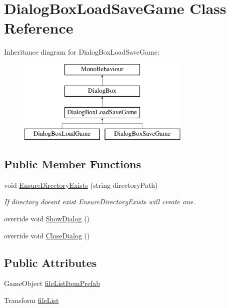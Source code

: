 \hypertarget{class_dialog_box_load_save_game}{}\section{Dialog\+Box\+Load\+Save\+Game Class Reference}
\label{class_dialog_box_load_save_game}
Inheritance diagram for Dialog\+Box\+Load\+Save\+Game\+:\begin{figure}[H]
\begin{center}
\leavevmode
\includegraphics[height=4.000000cm]{class_dialog_box_load_save_game}
\end{center}
\end{figure}
\subsection*{Public Member Functions}
\begin{DoxyCompactItemize}
\item 
void \hyperlink{class_dialog_box_load_save_game_adb463c1d803a7e68e0378b6e48fb2a85}{Ensure\+Directory\+Exists} (string directory\+Path)
\begin{DoxyCompactList}\small\item\em If directory doesn\textquotesingle{}t exist Ensure\+Directory\+Exists will create one. \end{DoxyCompactList}\item 
override void \hyperlink{class_dialog_box_load_save_game_ae44957b0dcc55696639d534c04574c57}{Show\+Dialog} ()
\item 
override void \hyperlink{class_dialog_box_load_save_game_ad3b5e6ab617a831b4db61010812e7665}{Close\+Dialog} ()
\end{DoxyCompactItemize}
\subsection*{Public Attributes}
\begin{DoxyCompactItemize}
\item 
Game\+Object \hyperlink{class_dialog_box_load_save_game_afd6eca777433df1fe27ced67205d745f}{file\+List\+Item\+Prefab}
\item 
Transform \hyperlink{class_dialog_box_load_save_game_ad75e9a340ab87784f8d4ba5787a9c675}{file\+List}
\end{DoxyCompactItemize}
